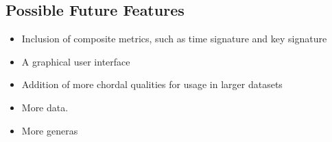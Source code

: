 \documentclass{article}
\begin{document}
\subsection{Possible Future Features}
\begin{itemize}
	\item Inclusion of composite metrics, such as time signature and key signature
	\item A graphical user interface
	\item Addition of more chordal qualities for usage in larger datasets
	\item More data.  
	\item More generas
\end{itemize}


\end{document}
